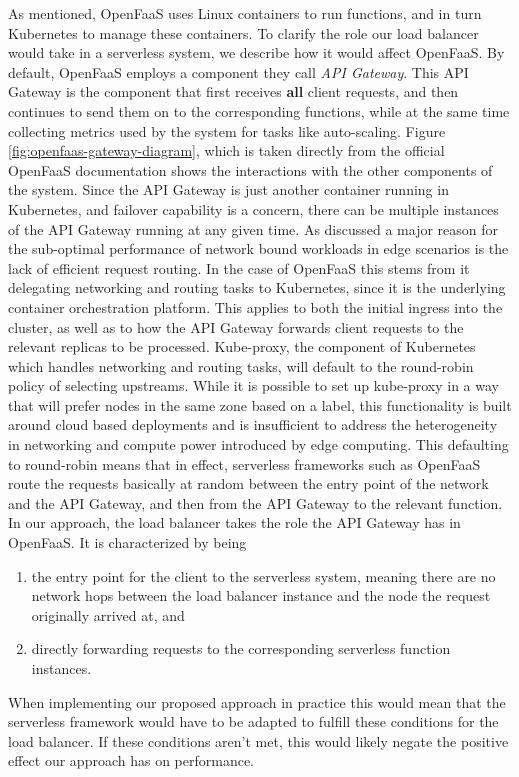 \documentclass[draft,final]{vutinfth} %
\begin{document}
As mentioned, OpenFaaS uses Linux containers to run functions, and in turn Kubernetes to manage these containers. To clarify the role our load balancer would take in a serverless system, we describe how it would affect OpenFaaS. By default, OpenFaaS employs a component they call \textit{API Gateway}. This API Gateway is the component that first receives \textbf{all} client requests, and then continues to send them on to the corresponding functions, while at the same time collecting metrics used by the system for tasks like auto-scaling. Figure \ref{fig:openfaas-gateway-diagram}, which is taken directly from the official OpenFaaS documentation shows the interactions with the other components of the system. Since the API Gateway is just another container running in Kubernetes\cite{kubernetes}, and failover capability is a concern, there can be multiple instances of the API Gateway running at any given time.
As discussed a major reason for the sub-optimal performance of network bound workloads in edge scenarios is the lack of efficient request routing.
In the case of OpenFaaS this stems from it delegating networking and routing tasks to Kubernetes, since it is the underlying container orchestration platform. This applies to both the initial ingress into the cluster, as well as to how the API Gateway forwards client requests to the relevant replicas to be processed. Kube-proxy, the component of Kubernetes which handles networking and routing tasks, will default to the round-robin policy of selecting upstreams. While it is possible to set up kube-proxy in a way that will prefer nodes in the same zone based on a label, this functionality is built around cloud based deployments and is insufficient to address the heterogeneity in networking and compute power introduced by edge computing. This defaulting to round-robin means that in effect, serverless frameworks such as OpenFaaS route the requests basically at random between the entry point of the network and the API Gateway, and then from the API Gateway to the relevant function.\\
In our approach, the load balancer takes the role the API Gateway has in OpenFaaS. It is characterized by being
\begin{enumerate}
    \item the entry point for the client to the serverless system, meaning there are no network hops between the load balancer instance and the node the request originally arrived at, and
    \item directly forwarding requests to the corresponding serverless function instances.
\end{enumerate}
When implementing our proposed approach in practice this would mean that the serverless framework would have to be adapted to fulfill these conditions for the load balancer. If these conditions aren't met, this would likely negate the positive effect our approach has on performance.
\end{document}
